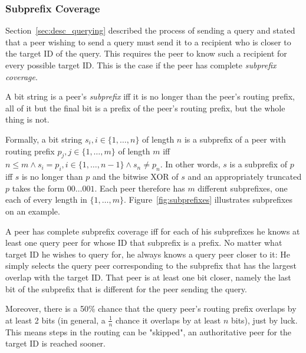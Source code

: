 \subsubsection{Subprefix Coverage}
Section~\ref{sec:desc_querying} described the process of sending a query and
stated that a peer wishing to send a query must send it to a recipient who is
closer to the target ID of the query. This requires the peer to know such a
recipient for every possible target ID. This is the case if the peer has
complete \emph{subprefix coverage}.

A bit string is a peer's \emph{subprefix} iff it is no longer than the peer's
routing prefix, all of it but the final bit is a prefix of the peer's routing
prefix, but the whole thing is not.

Formally, a bit string $s_i, i \in \{1, \ldots, n\}$ of length $n$ is a
subprefix of a peer with routing prefix $p_j, j \in \{1, \ldots, m\}$ of length
$m$ iff $n \leq m \land s_i = p_i, i \in \{1, \ldots, n - 1\} \land s_n \neq
p_n$. In other words, $s$ is a subprefix of $p$ iff $s$ is no longer than $p$
and the bitwise XOR of $s$ and an appropriately truncated $p$ takes the form
$00\ldots001$. Each peer therefore has $m$ different subprefixes, one each of
every length in $\{1, \ldots, m\}$. Figure~\ref{fig:subprefixes} illustrates
subprefixes on an example.

A peer has complete subprefix coverage iff for each of his subprefixes he knows
at least one query peer for whose ID that subprefix is a prefix. No matter what
target ID he wishes to query for, he always knows a query peer closer to it: He
simply selects the query peer corresponding to the subprefix that has the
largest overlap with the target ID. That peer is at least one bit closer, namely
the last bit of the subprefix that is different for the peer sending the query.

Moreover, there is a 50\% chance that the query peer's routing prefix overlaps
by at least 2 bits (in general, a $\frac{1}{n}$ chance it overlaps by at least
$n$ bits), just by luck. This means steps in the routing can be "skipped", an
authoritative peer for the target ID is reached sooner.

